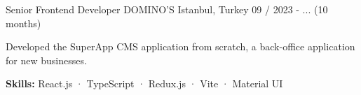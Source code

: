 

\begin{cventries}

\cventry
  {Senior Frontend Developer} %
  {DOMINO'S} %
  {Istanbul, Turkey} %
  {09 / 2023 - ... (10 months)}
  {
    \begin{cvitems} %
      \item {Developed the SuperApp CMS application from scratch, a back-office application for new businesses.}
      \item {\textbf {Skills:} React.js · TypeScript · Redux.js · Vite · Material UI}
    \end{cvitems}
  }


\end{cventries}
